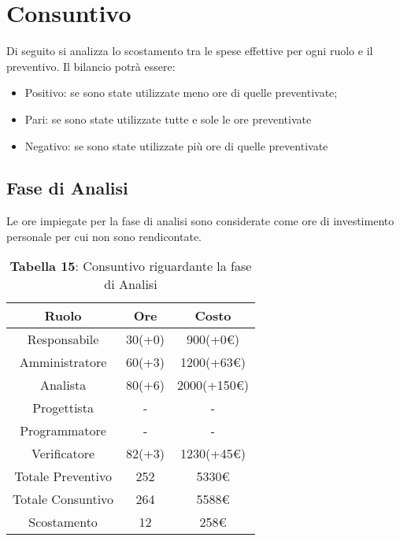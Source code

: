 \section{Consuntivo}
Di seguito si analizza lo scostamento tra le spese effettive per ogni ruolo e il preventivo. Il bilancio potrà essere:
\begin{itemize}
	\item Positivo: se sono state utilizzate meno ore di quelle preventivate;
	\item Pari: se sono state utilizzate tutte e sole le ore preventivate
	\item Negativo: se sono state utilizzate più ore di quelle preventivate
\end{itemize}
\subsection{Fase di Analisi}
Le ore impiegate per la fase di analisi sono considerate come ore di investimento personale per cui non sono rendicontate.
\begin{table}[H]
	\centering
	\renewcommand{\arraystretch}{1.5}
	\begin{tabular}{|c|c|c|}
		\hline
		\rowcolor{lighter-grayer}
		Ruolo & Ore & Costo \\
		\hline
		Responsabile & 30(+0) & 900(+0\euro) \\
		\hline
		Amministratore & 60(+3) & 1200(+63\euro)  \\
		\hline
		Analista &  80(+6) & 2000(+150\euro)  \\
		\hline
		Progettista& - & - \\
		\hline
		Programmatore & - & - \\
		\hline
		Verificatore & 82(+3) & 1230(+45\euro) \\
		\hline
		Totale Preventivo & 252 & 5330\euro \\
		\hline
		Totale Consuntivo & 264 & 5588\euro \\
		\hline
		Scostamento & 12 & 258\euro \\
		\hline
	\end{tabular}
	\caption*{\textbf{Tabella 15}: Consuntivo riguardante la fase di Analisi\\}
\end{table}
